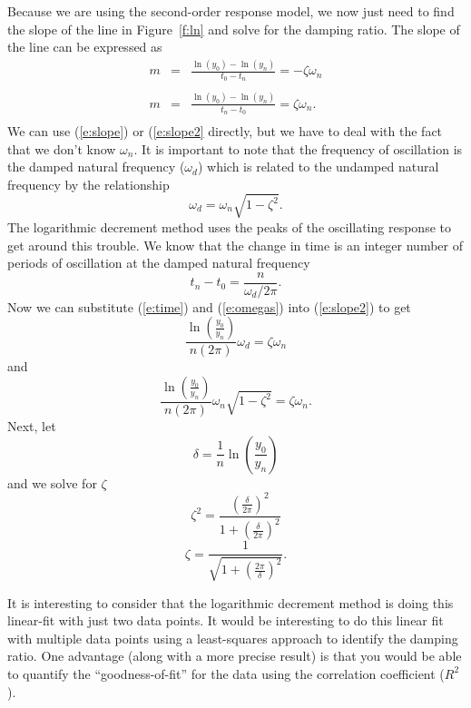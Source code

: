 Because we are using the second-order response model, we now just need to find the slope of the line in Figure~\ref{f:ln} and solve for the damping ratio.  The slope of the line can be expressed as
\begin{eqnarray}
m & = & \frac{\ln(y_0)-\ln(y_n)}{t_0-t_n}=-\zeta \omega_n \\
\label{e:slope} \\
m & = & \frac{\ln(y_0)-\ln(y_n)}{t_n-t_0}=\zeta \omega_n. \\
\label{e:slope2}
\end{eqnarray}
We can use (\ref{e:slope}) or (\ref{e:slope2} directly, but we have to deal with the fact that we don't know $\omega_n$.  It is important to note that the frequency of oscillation is the damped natural frequency ($\omega_d$) which is related to the undamped natural frequency by the relationship
\begin{equation}
\omega_d=\omega_n\sqrt{1-\zeta^2}.
\label{e:omegas}
\end{equation}
The logarithmic decrement method uses the peaks of the oscillating response to get around this trouble.  We know that the change in time is an integer number of periods of oscillation at the damped natural frequency
\begin{equation}
t_n-t_0 = \frac{n}{\omega_d / 2 \pi}.
\label{e:time}
\end{equation}
Now we can substitute (\ref{e:time}) and (\ref{e:omegas}) into (\ref{e:slope2}) to get
\[
\frac{\ln\left(\frac{y_0}{y_n}\right)}{n (2 \pi)} \omega_d = \zeta \omega_n
\]
and
\[
\frac{\ln\left(\frac{y_0}{y_n}\right)}{n (2 \pi)} \omega_n \sqrt{1-\zeta^2} = \zeta \omega_n.
\]
Next, let 
\[ \delta = \frac{1}{n}\ln\left(\frac{y_0}{y_n}\right) \]
and we solve for $\zeta$
\[
\zeta^2=\frac{\left(\frac{\delta}{2 \pi}\right)^2}{1+\left(\frac{\delta}{2 \pi}\right)^2}
\]
\[ \zeta = \frac{1}{\sqrt{1+\left(\frac{2\pi}{\delta}\right)^2}}. \]

It is interesting to consider that the logarithmic decrement method is doing this linear-fit with just two data points.  It would be interesting to do this linear fit with multiple data points using a least-squares approach to identify the damping ratio.  One advantage (along with a more precise result) is that you would be able to quantify the ``goodness-of-fit'' for the data using the correlation coefficient ($R^2$).




